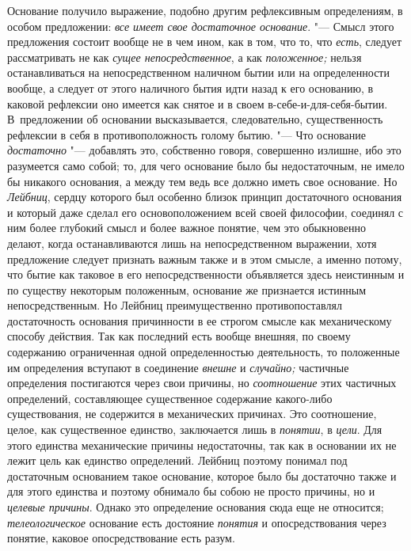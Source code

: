 Основание получило выражение, подобно другим рефлексивным определениям, в
особом предложении: {\em все имеет свое достаточное
основание}. "--- Смысл этого предложения состоит вообще не в чем ином, как в
том, что то, что {\em есть}, следует рассматривать не
как {\em сущее непосредственное}, а как
{\em положенное;} нельзя останавливаться на
непосредственном наличном бытии или на определенности вообще, а следует от
этого наличного бытия идти назад к его основанию, в каковой рефлексии оно
имеется как снятое и в своем в-себе-и-для-себя-бытии. В~предложении об
основании высказывается, следовательно, существенность рефлексии в себя в
противоположность голому бытию. "--- Что основание
{\em достаточно} "--- добавлять это, собственно говоря,
совершенно излишне, ибо это разумеется само собой; то, для чего основание
было бы недостаточным, не имело бы никакого основания, а между тем ведь все
должно иметь свое основание. Но {\em Лейбниц}, сердцу
которого был особенно близок принцип достаточного основания и который даже
сделал его основоположением всей своей философии, соединял с ним более
глубокий смысл и более важное понятие, чем это обыкновенно делают, когда
останавливаются лишь на непосредственном выражении, хотя предложение
следует признать важным также и в этом смысле, а именно потому, что бытие
как таковое в его непосредственности объявляется здесь неистинным и по
существу некоторым положенным, основание же признается истинным
непосредственным. Но Лейбниц преимущественно противопоставлял достаточность
основания причинности в ее строгом смысле как механическому способу
действия. Так как последний есть вообще внешняя, по своему содержанию
ограниченная одной определенностью деятельность, то положенные им
определения вступают в соединение {\em внешне} и
{\em случайно;} частичные определения постигаются через
свои причины, но {\em соотношение} этих частичных
определений, составляющее существенное содержание какого-либо
существования, не содержится в механических причинах. Это соотношение,
целое, как существенное единство, заключается лишь в
{\em понятии}, в {\em цели}. Для
этого единства механические причины недостаточны, так как в основании их не
лежит цель как единство определений. Лейбниц поэтому понимал под
достаточным основанием такое основание, которое было бы достаточно также и
для этого единства и поэтому обнимало бы собою не просто причины, но и
{\em целевые причины}. Однако это определение основания
сюда еще не относится; {\em телеологическое} основание
есть достояние {\em понятия} и опосредствования через
понятие, каковое опосредствование есть разум.

